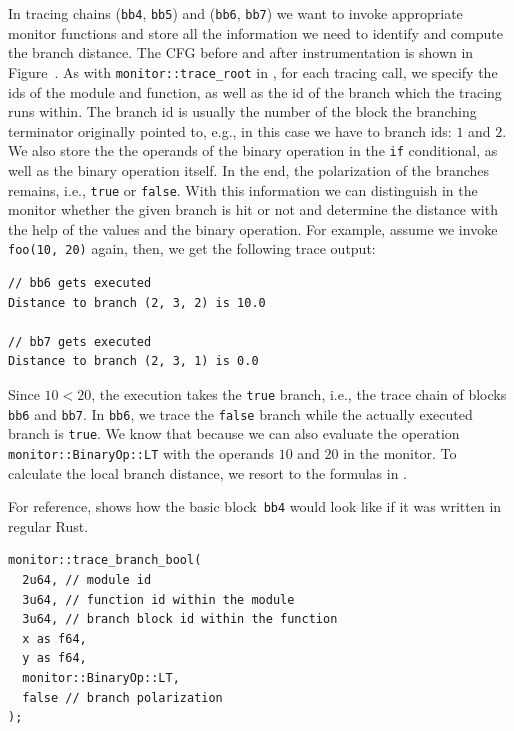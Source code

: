 \documentclass[paper=a4,%
  twoside,%
  BCOR4mm,%
  abstract=true,%
  toc=bibliography,%
  chapterprefix=true,%
  toc=bibliographynumbered,%
  open=right,%
  english,%
  pagesize=pdftex]{scrreprt}
\begin{document}
In tracing chains (\lstinline{bb4}, \lstinline{bb5}) and (\lstinline{bb6}, \lstinline{bb7}) we want to invoke appropriate monitor functions and store all the information we need to identify and compute the branch distance. The \ac{CFG} before and after instrumentation is shown in Figure~. As with \lstinline{monitor::trace_root} in , for each tracing call, we specify the ids of the module and function, as well as the id of the branch which the tracing runs within. The branch id is usually the number of the block the branching terminator originally pointed to, e.g., in this case we have to branch ids: $1$ and $2$. We also store the the operands of the binary operation in the \lstinline{if} conditional, as well as the binary operation itself. In the end, the polarization of the branches remains, i.e., \lstinline{true} or \lstinline{false}. With this information we can distinguish in the monitor whether the given branch is hit or not and determine the distance with the help of the values and the binary operation. For example, assume we invoke \lstinline{foo(10, 20)} again, then, we get the following trace output:

\begin{lstlisting}[language={}, style=boxed, caption={}, label=lst:mir-instrument-branch-trace-output]
// bb6 gets executed
Distance to branch (2, 3, 2) is 10.0

// bb7 gets executed
Distance to branch (2, 3, 1) is 0.0
\end{lstlisting}

Since $10 < 20$, the execution takes the \lstinline{true} branch, i.e., the trace chain of blocks \lstinline{bb6} and \lstinline{bb7}. In \lstinline{bb6}, we trace the \lstinline{false} branch while the actually executed branch is \lstinline{true}. We know that because we can also evaluate the operation \lstinline{monitor::BinaryOp::LT} with the operands $10$ and $20$ in the monitor. To calculate the local branch distance, we resort to the formulas in .

For reference,  shows how the basic block~\lstinline{bb4} would look like if it was written in regular Rust.

\begin{lstlisting}[language={}, style=boxed, caption={How would \lstinline{bb4} look like in regular Rust code}, label=lst:basic-block-in-regular-rust]
monitor::trace_branch_bool(
  2u64, // module id
  3u64, // function id within the module
  3u64, // branch block id within the function
  x as f64,
  y as f64,
  monitor::BinaryOp::LT,
  false // branch polarization
);
\end{lstlisting}
\end{document}
